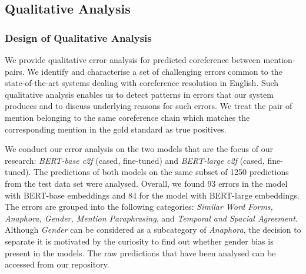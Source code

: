\documentclass[11pt]{article}
\begin{document}
\subsection{Qualitative Analysis}


\subsubsection{Design of Qualitative Analysis}



We provide qualitative error analysis for predicted coreference between mention-pairs. We identify and characterise a set of challenging errors common to the state-of-the-art systems dealing with coreference resolution in English. Such qualitative analysis enables us to detect patterns in errors that our system produces and to discuss underlying reasons for such errors. We treat the pair of mention belonging to the same coreference chain which matches the corresponding mention in the gold standard as true positives. 

We conduct our error analysis on the two models that are the focus of our research: \textit{BERT-base c2f} (cased, fine-tuned) and \textit{BERT-large c2f} (cased, fine-tuned). The predictions of both models on the same subset of 1250 predictions from the test data set were analysed. Overall, we found 93 errors in the model with BERT-base embeddings and 84 for the model with BERT-large embeddings. The errors are grouped into the following categories: \textit{Similar Word Forms, Anaphora, Gender, Mention Paraphrasing}, and \textit{Temporal and Spacial Agreement}. Although \textit{Gender} can be considered as a subcategory of \textit{Anaphora}, the decision to separate it is motivated by the curiosity to find out whether gender bias is present in the models.
The raw predictions that have been analysed can be accessed from our repository. 
\end{document}
